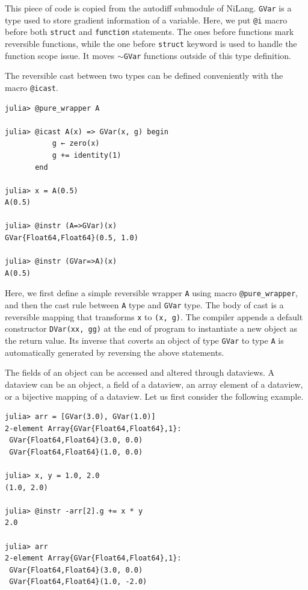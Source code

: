 \documentclass[aps,twocolumn,longbibliography,english,superscriptaddress]{revtex4-1}
\newcommand{\<}{\langle}
\renewcommand{\>}{\rangle}
\theoremstyle{definition}\newtheorem{definition}{\textit{Definition}}
\begin{document}
This piece of code is copied from the autodiff submodule of NiLang. \texttt{GVar} is a type used to store gradient information of a variable.
Here, we put \texttt{@i} macro before both \texttt{struct} and \texttt{function} statements. The ones before functions mark reversible functions, while the one before \texttt{struct} keyword is used to handle the function scope issue. It moves \texttt{$\sim$GVar} functions outside of this type definition.

The reversible cast between two types can be defined conveniently with the macro \texttt{@icast}.

\begin{minipage}{.44\textwidth}
\begin{lstlisting}
julia> @pure_wrapper A

julia> @icast A(x) => GVar(x, g) begin
           g ← zero(x)
           g += identity(1)
       end

julia> x = A(0.5)
A(0.5)

julia> @instr (A=>GVar)(x)
GVar{Float64,Float64}(0.5, 1.0)

julia> @instr (GVar=>A)(x)
A(0.5)
\end{lstlisting}
\end{minipage}

Here, we first define a simple reversible wrapper \texttt{A} using macro \texttt{@pure\_wrapper}, and then the cast rule between \texttt{A} type and \texttt{GVar} type.
The body of cast is a reversible mapping that transforms \texttt{x} to \texttt{(x, g)}. The compiler appends a default constructor \texttt{DVar(xx, gg)} at the end of program to instantiate a new object as the return value.
Its inverse that coverts an object of type \texttt{GVar} to type \texttt{A} is automatically generated by reversing the above statements.

The fields of an object can be accessed and altered through dataviews. A dataview can be an object, a field of a dataview, an array element of a dataview, or a bijective mapping of a dataview.
Let us first consider the following example.

\begin{minipage}{.44\textwidth}
\begin{lstlisting}
julia> arr = [GVar(3.0), GVar(1.0)]
2-element Array{GVar{Float64,Float64},1}:
 GVar{Float64,Float64}(3.0, 0.0)
 GVar{Float64,Float64}(1.0, 0.0)

julia> x, y = 1.0, 2.0
(1.0, 2.0)

julia> @instr -arr[2].g += x * y
2.0

julia> arr
2-element Array{GVar{Float64,Float64},1}:
 GVar{Float64,Float64}(3.0, 0.0) 
 GVar{Float64,Float64}(1.0, -2.0)
\end{lstlisting}
\end{minipage}
\end{document}
